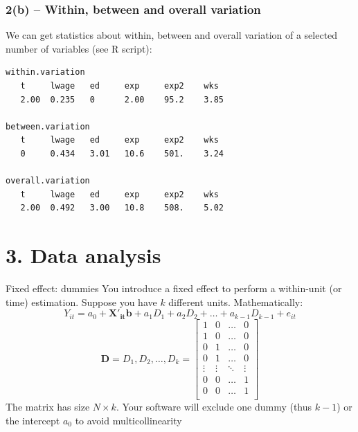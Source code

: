 \documentclass[xcolor=table,dvipsnames]{beamer}
\begin{document}
\begin{frame}[fragile]
\frametitle{2(b) -- Within, between and overall variation}
We can get statistics about within, between and overall variation of a selected number of variables (see R script): \pause

\begin{small}
\begin{verbatim}
within.variation
   t     lwage   ed     exp     exp2    wks
   2.00	 0.235   0      2.00    95.2    3.85
   
between.variation
   t     lwage   ed     exp     exp2    wks
   0     0.434   3.01   10.6    501.    3.24
  
overall.variation
   t     lwage   ed     exp     exp2    wks
   2.00  0.492   3.00   10.8    508.    5.02
\end{verbatim}
\end{small}
\end{frame}

\section{3. Data analysis}

\begin{frame}{Fixed effect: dummies}
You introduce a fixed effect to perform a within-unit (or time) estimation. \pause Suppose you have $k$ different units. Mathematically:
$$Y_{it} = a_0 + \mathbf{X'_{it} b} + a_1 D_1 + a_2 D_2 + \ldots + a_{k-1} D_{k-1} + e_{it} $$
$$\mathbf{D} = D_1, D_2, \ldots, D_k =
\left[
\begin{array}{cccc}
1			& 0			& \ldots	& 0 		\\
1 			& 0	 		& \ldots	& 0 		\\
0			& 1			& \ldots	& 0 		\\
0			& 1			& \ldots	& 0 		\\
\vdots 		& \vdots	& \ddots 	& \vdots	\\
0			& 0			& \ldots	& 1			\\
0 			& 0			& \ldots	& 1 		\\
\end{array}
\right]
$$ \pause
The matrix has size $N \times k$. Your software will exclude one dummy (thus $k-1$) or the intercept $a_0$ to avoid multicollinearity
\end{frame}
\end{document}

